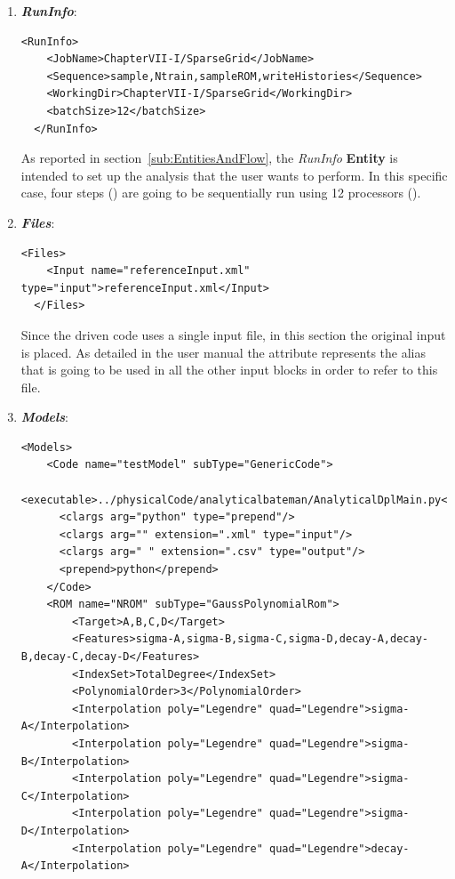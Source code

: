 \begin{enumerate}
   \item \textbf{\textit{RunInfo}}:
\begin{lstlisting}[style=XML,morekeywords={arg,extension,pauseAtEnd,overwrite}]
  <RunInfo>
    <JobName>ChapterVII-I/SparseGrid</JobName>
    <Sequence>sample,Ntrain,sampleROM,writeHistories</Sequence>
    <WorkingDir>ChapterVII-I/SparseGrid</WorkingDir>
    <batchSize>12</batchSize>
  </RunInfo>
\end{lstlisting}   
   As reported in section~\ref{sub:EntitiesAndFlow}, the \textit{RunInfo} \textbf{Entity} is intended to set up the analysis 
   that the user wants to perform. In this specific case, four steps () are going to be sequentially run 
   using 12 processors (). 
   \item \textbf{\textit{Files}}:
\begin{lstlisting}[style=XML,morekeywords={arg,extension,pauseAtEnd,overwrite}]
  <Files>
    <Input name="referenceInput.xml" type="input">referenceInput.xml</Input>
  </Files>
\end{lstlisting}
   Since the driven code uses a single input file, in this section the original input is placed. As detailed in the user manual
   the attribute   represents the alias that is going to be used in all the other input blocks in order to refer to this file.
   \item \textbf{\textit{Models}}:
\begin{lstlisting}[style=XML,morekeywords={arg,extension,pauseAtEnd,overwrite}]
  <Models>
    <Code name="testModel" subType="GenericCode">
      <executable>../physicalCode/analyticalbateman/AnalyticalDplMain.py</executable>
      <clargs arg="python" type="prepend"/>
      <clargs arg="" extension=".xml" type="input"/>
      <clargs arg=" " extension=".csv" type="output"/>
      <prepend>python</prepend>
    </Code>
    <ROM name="NROM" subType="GaussPolynomialRom">
        <Target>A,B,C,D</Target>
        <Features>sigma-A,sigma-B,sigma-C,sigma-D,decay-A,decay-B,decay-C,decay-D</Features>
        <IndexSet>TotalDegree</IndexSet>
        <PolynomialOrder>3</PolynomialOrder>
        <Interpolation poly="Legendre" quad="Legendre">sigma-A</Interpolation>
        <Interpolation poly="Legendre" quad="Legendre">sigma-B</Interpolation>
        <Interpolation poly="Legendre" quad="Legendre">sigma-C</Interpolation>
        <Interpolation poly="Legendre" quad="Legendre">sigma-D</Interpolation>
        <Interpolation poly="Legendre" quad="Legendre">decay-A</Interpolation>

\end{lstlisting}
\end{enumerate}
